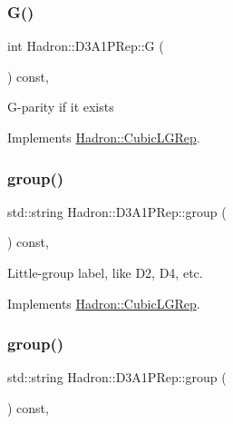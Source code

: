 \subsubsection{\texorpdfstring{G()}{G()}\hspace{0.1cm}{\footnotesize\ttfamily [2/2]}}
{\footnotesize\ttfamily int Hadron\+::\+D3\+A1\+P\+Rep\+::G (\begin{DoxyParamCaption}{ }\end{DoxyParamCaption}) const\hspace{0.3cm}{\ttfamily [inline]}, {\ttfamily [virtual]}}

G-\/parity if it exists 

Implements \mbox{\hyperlink{structHadron_1_1CubicLGRep_ace26f7b2d55e3a668a14cb9026da5231}{Hadron\+::\+Cubic\+L\+G\+Rep}}.

\mbox{\label{structHadron_1_1D3A1PRep_a1c8c6294dd6e9886efa5f3862c77cbcc}} 
\subsubsection{\texorpdfstring{group()}{group()}\hspace{0.1cm}{\footnotesize\ttfamily [1/2]}}
{\footnotesize\ttfamily std\+::string Hadron\+::\+D3\+A1\+P\+Rep\+::group (\begin{DoxyParamCaption}{ }\end{DoxyParamCaption}) const\hspace{0.3cm}{\ttfamily [inline]}, {\ttfamily [virtual]}}

Little-\/group label, like D2, D4, etc. 

Implements \mbox{\hyperlink{structHadron_1_1CubicLGRep_a9bdb14b519a611d21379ed96a3a9eb41}{Hadron\+::\+Cubic\+L\+G\+Rep}}.

\mbox{\label{structHadron_1_1D3A1PRep_a1c8c6294dd6e9886efa5f3862c77cbcc}} 
\subsubsection{\texorpdfstring{group()}{group()}\hspace{0.1cm}{\footnotesize\ttfamily [2/2]}}
{\footnotesize\ttfamily std\+::string Hadron\+::\+D3\+A1\+P\+Rep\+::group (\begin{DoxyParamCaption}{ }\end{DoxyParamCaption}) const\hspace{0.3cm}{\ttfamily [inline]}, {\ttfamily [virtual]}}

